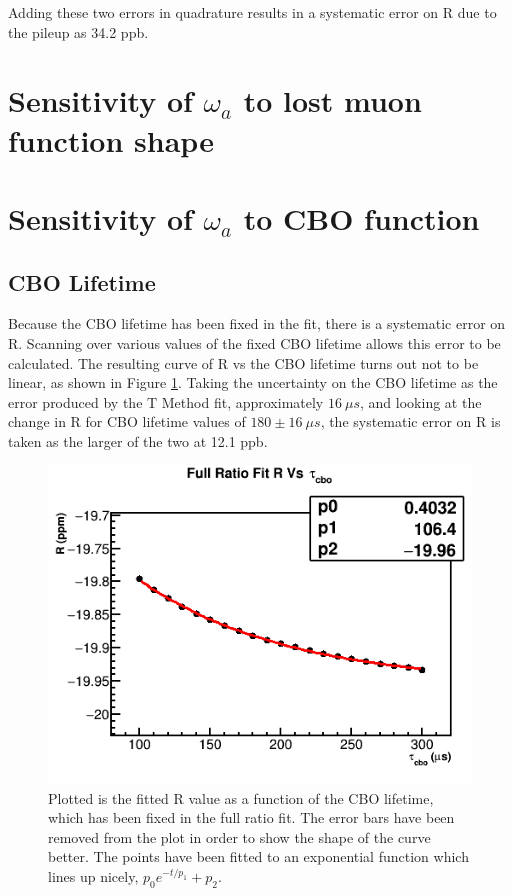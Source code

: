 Adding these two errors in quadrature results in a systematic error on R due to the pileup as 34.2 ppb.



\section{Sensitivity of \texorpdfstring{$\omega_{a}$}{} to lost muon function shape}

\section{Sensitivity of \texorpdfstring{$\omega_{a}$}{} to CBO function}


\subsection{CBO Lifetime}

Because the CBO lifetime has been fixed in the fit, there is a systematic error on R. Scanning over various values of the fixed CBO lifetime allows this error to be calculated. The resulting curve of R vs the CBO lifetime turns out not to be linear, as shown in Figure \ref{fig:CBOLifetime}. Taking the uncertainty on the CBO lifetime as the error produced by the T Method fit, approximately $\SI{16}{\mu s}$, and looking at the change in R for CBO lifetime values of $180 \pm \SI{16}{\mu s}$, the systematic error on R is taken as the larger of the two at 12.1 ppb.

\begin{figure}[]
	\centering
	\includegraphics[width=.6\textwidth]{RatioCBO_R_Vs_tau_cbo_Canv}
    \caption[CBOLifetime]{Plotted is the fitted R value as a function of the CBO lifetime, which has been fixed in the full ratio fit. The error bars have been removed from the plot in order to show the shape of the curve better. The points have been fitted to an exponential function which lines up nicely, $p_{0} e^{-t/p_{1}} + p_{2}$.}
    \label{fig:CBOLifetime}
\end{figure}

